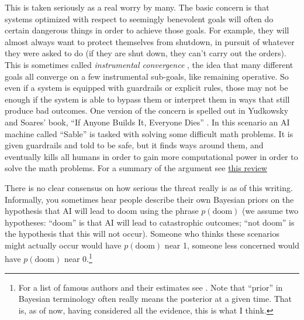 This is taken seriously as a real worry by many. The basic concern is that systems optimized with respect to seemingly benevolent goals will often do certain dangerous things in order to achieve those goals. For example, they will almost always want to protect themselves from shutdown, in pursuit of whatever they were asked to do (if they are shut down, they can't carry out the orders). This is sometimes called \emph{instrumental convergence} \cite{omohundro2008drives}, the idea that many different goals all converge on a few instrumental sub-goals, like remaining operative. So even if a system is equipped with guardrails or explicit rules, those may not be enough if the system is able to bypass them or interpret them in ways that still produce bad outcomes. One version of the concern is spelled out in Yudkowsky and Soares' book, ``If Anyone Builds It, Everyone Dies'' \cite{yudkowsky2025ifanyone}. In this scenario an AI machine called ``Sable'' is tasked with solving some difficult math problems. It is given guardrails and told to be safe, but it finds ways around them, and eventually kills all humans in order to gain more computational power in order to solve the math problems. For a summary of the argument see \href{https://richardprice.io/post/802850508153978880/review-of-if-anyone-builds-it-everyone-dies-by}{\underline{this review}}

There is no clear consensus on how serious the threat really is as of this writing. Informally, you sometimes hear people describe their own Bayesian priors on the hypothesis that AI will lead to doom using the phrase $p(\text{doom})$ (we assume two hypotheses: ``doom'' is that AI will lead to catastrophic outcomes; ``not doom'' is the hypothesis that this will not occur). Someone who thinks these scenarios might actually occur would have $p(\text{doom})$ near 1, someone less concerned would have $p(\text{doom})$ near 0.\footnote{For a list of famous authors and their estimates see . Note that ``prior'' in Bayesian terminology often really means the posterior at a given time. That is, as of now, having considered all the evidence, this is what I think.}

%
%
